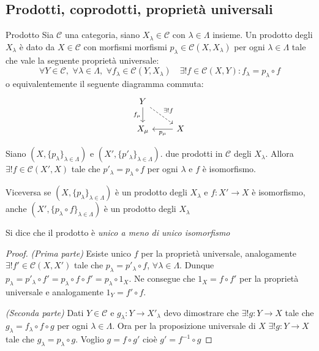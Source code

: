 \subsection{Prodotti, coprodotti, proprietà universali}

\begin{definition}{Prodotto}
Sia \(\mathcal{\mathcal{C}}\) una categoria, siano \(
X_\lambda \in \mathcal{\mathcal{C}}\) con \(\lambda \in \Lambda\) insieme. Un prodotto
degli \(
X_\lambda\) è dato da \(X \in \mathcal{\mathcal{C}}\) con morfismi morfismi \(p_\lambda
\in \mathcal{C}{(X, X_\lambda)}\) per ogni \(\lambda \in \Lambda\) tale che
vale la seguente proprietà universale:
\[
  \forall Y \in \mathcal{\mathcal{C}}, \,\, \forall \lambda \in \Lambda, \,\, \forall f_{\lambda} \in \mathcal{\mathcal{C}}{(Y, X_\lambda)} \quad \exists ! f \in \mathcal{\mathcal{C}}{(X, Y)} : f_\lambda = p_\lambda \circ f
\]
o equivalentemente il seguente diagramma commuta:
\[\begin{tikzcd}
	Y \\
	{X_\mu} & X
	\arrow["{f_\mu}"', from=1-1, to=2-1]
	\arrow["{\exists ! f}", dashed, from=1-1, to=2-2]
	\arrow["{p_\mu}", from=2-2, to=2-1]
\end{tikzcd}\]
\end{definition}

\begin{proposition}{}
    Siano \({(X, \{p_\lambda\}_{\lambda \in \Lambda} )}\) e \({(X', \{p'_{\lambda} \}_{\lambda \in \Lambda} )}\).
    due prodotti in \(\mathcal{C}\) degli \(X_{\lambda} \). Allora \(\exists ! f \in \mathcal{\mathcal{C}}{(X', X)}\) 
    tale che \(p'_\lambda = p_\lambda \circ f\) per ogni \(\lambda\) e \(f\) è
    isomorfismo. 

    Viceversa se \({(X, \{p_\lambda\}_{\lambda \in \Lambda} )}\) è un prodotto
    degli \(X_\lambda\) e \(f : X' \to X\) è isomorfismo, anche \({(X', \{p_\lambda \circ f\}_{\lambda \in \Lambda} )}\) è un prodotto degli \(X_\lambda\) 
\end{proposition}
\begin{remark}{}
    Si dice che il prodotto è \emph{unico a meno di unico isomorfismo}
\end{remark}
\begin{proof}
    \emph{(Prima parte)}
    Esiste unico \(f\) per la proprietà universale, analogamente \(\exists ! f'
    \in \mathcal{\mathcal{C}}{(X, X')}\) tale che \(p_\lambda = p'_\lambda \circ f\), \(\forall \lambda \in \Lambda\). Dunque \(p_\lambda = p'_\lambda \circ f' = p_\lambda \circ f \circ f' = p_\lambda
     \circ 1_X\). Ne consegue che \(1_X = f \circ f'\) per la proprietà
     universale e analogamente \(1_Y = f'\circ f\).

     \emph{(Seconda parte)} Dati \(Y \in \mathcal{\mathcal{C}}\) e \(g_\lambda : Y \to
     X'_\lambda\) devo dimostrare che \(\exists ! g : Y \to X\) tale che \(
     g_\lambda = f_\lambda \circ f \circ g\) per ogni \(\lambda \in \Lambda\).
     Ora per la proposizione universale di \(X\) \(\exists ! g : Y \to X\) tale
     che \(g_\lambda = p_\lambda \circ g\). Voglio \(g = f \circ g'\) cioè \(g'
     = f^{-1} \circ g\) 
\end{proof}

